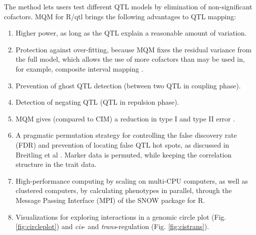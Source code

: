 The method lets users test different QTL models by elimination of non-significant cofactors. 
MQM for R/qtl brings the following advantages to QTL mapping:
\begin{enumerate}\itemsep1pt
\item Higher power, as long as the QTL explain a reasonable amount of variation.
\item Protection against over-fitting, because MQM fixes the residual variance from the full 
model, which allows the use of more cofactors than may be used in, for example, composite 
interval mapping \cite{Zeng:1994}.
\item Prevention of ghost QTL detection (between two QTL in coupling phase).
\item Detection of negating QTL (QTL in repulsion phase). 
\item MQM gives (compared to CIM) a reduction in type I and type II error \cite{Handbook:Jansen:2007}.
\item A pragmatic permutation strategy for controlling the false discovery rate (FDR) and 
prevention of locating false QTL hot spots, as discussed in Breitling et al \cite{Breitling:2008a}. 
Marker data is permuted, while keeping the correlation structure in the trait data.
\item High-performance computing by scaling on multi-CPU computers, as well as clustered 
computers, by calculating phenotypes in parallel, through the Message Passing Interface (MPI) of 
the SNOW package for R\cite{Tierney:2009}.
\item Visualizations for exploring interactions in a genomic circle plot (Fig. \ref{fig:circleplot}) and \emph{cis}- 
and \emph{trans}-regulation (Fig. \ref{fig:cistrans}).
\end{enumerate}

